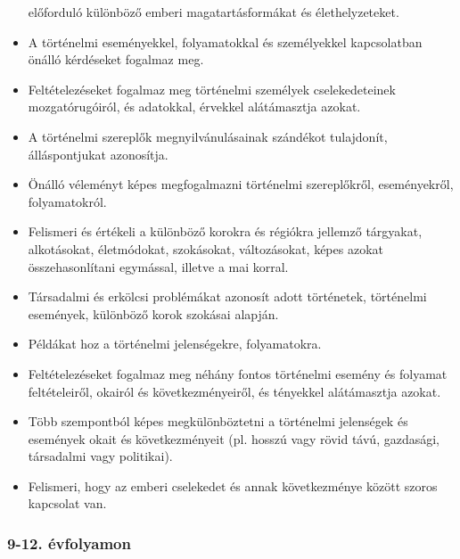 \begin{itemize}
  előforduló különböző emberi magatartásformákat és élethelyzeteket.
\item
  A történelmi eseményekkel, folyamatokkal és személyekkel kapcsolatban
  önálló kérdéseket fogalmaz meg.
\item
  Feltételezéseket fogalmaz meg történelmi személyek cselekedeteinek
  mozgatórugóiról, és adatokkal, érvekkel alátámasztja azokat.
\item
  A történelmi szereplők megnyilvánulásainak szándékot tulajdonít,
  álláspontjukat azonosítja.
\item
  Önálló véleményt képes megfogalmazni történelmi szereplőkről,
  eseményekről, folyamatokról.
\item
  Felismeri és értékeli a különböző korokra és régiókra jellemző
  tárgyakat, alkotásokat, életmódokat, szokásokat, változásokat, képes
  azokat összehasonlítani egymással, illetve a mai korral.
\item
  Társadalmi és erkölcsi problémákat azonosít adott történetek,
  történelmi események, különböző korok szokásai alapján.
\item
  Példákat hoz a történelmi jelenségekre, folyamatokra.
\item
  Feltételezéseket fogalmaz meg néhány fontos történelmi esemény és
  folyamat feltételeiről, okairól és következményeiről, és tényekkel
  alátámasztja azokat.
\item
  Több szempontból képes megkülönböztetni a történelmi jelenségek és
  események okait és következményeit (pl. hosszú vagy rövid távú,
  gazdasági, társadalmi vagy politikai).
\item
  Felismeri, hogy az emberi cselekedet és annak következménye között
  szoros kapcsolat van.
\end{itemize}

\hypertarget{evfolyamon-37}{%
\subsubsection{9-12. évfolyamon}\label{evfolyamon-37}}


